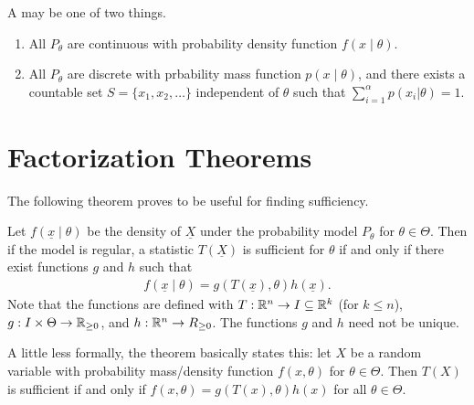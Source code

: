 \begin{definition}
    A  may be one of two things.
    \begin{enumerate}
        \item All $P_{\theta}$ are continuous with probability density function $f(x \mid \theta)$.
        \item All $P_{\theta}$ are discrete with prbability mass function $p(x \mid \theta)$, and there exists a countable set $S = \{x_{1},x_{2},\ldots\}$ independent of $\theta$ such that $\sum_{i=1}^{\alpha} p(x_{i} | \theta) = 1$.
    \end{enumerate}
\end{definition}


\section{Factorization Theorems}
The following theorem proves to be useful for finding sufficiency.
\begin{theorem}
    Let $f(\underline{x}\mid \theta)$ be the density of $\underline{X}$ under the probability model $P_{\theta}$ for $\theta \in \Theta$. Then if the model is regular, a statistic $T(\underline{X})$ is sufficient for $\theta$ if and only if there exist functions $g$ and $h$ such that
    \begin{align}
        f(\underline{x} \mid \theta) = g(T(\underline{x}), \theta) h(\underline{x}).
    \end{align}
    Note that the functions are defined with $T:\mathbb{R}^{n} \to I \subseteq \mathbb{R}^{k}$ (for $k \leq n$), $g:I \times \Theta \to \mathbb{R}_{\geq 0}$, and $h:\mathbb{R}^{n} \to R_{\geq 0}$. The functions $g$ and $h$ need not be unique.
\end{theorem}
A little less formally, the theorem basically states this: let $X$ be a random variable with probability mass/density function $f(x,\theta)$ for $\theta \in \Theta$. Then $T(X)$ is sufficient if and only if $f(x,\theta) = g(T(x),\theta)h(x)$ for all $\theta \in \Theta$.

